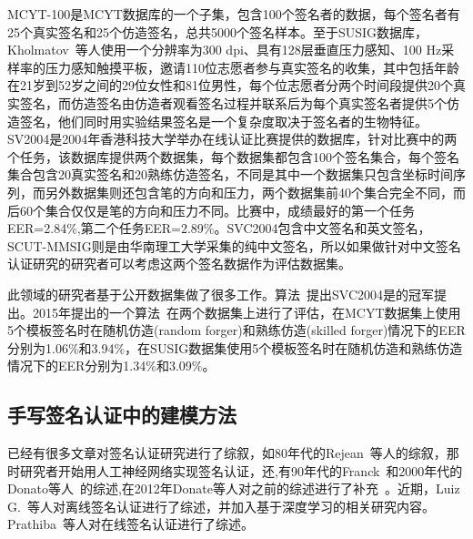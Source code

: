 MCYT-100是MCYT数据库的一个子集，包含100个签名者的数据，每个签名者有25个真实签名和25个仿造签名，总共5000个签名样本。至于SUSIG数据库，Kholmatov~\cite{kholmatov2006sigsa}等人使用一个分辨率为300 dpi、具有128层垂直压力感知、100 Hz采样率的压力感知触摸平板，邀请110位志愿者参与真实签名的收集，其中包括年龄在21岁到52岁之间的29位女性和81位男性，每个位志愿者分两个时间段提供20个真实签名，而仿造签名由仿造者观看签名过程并联系后为每个真实签名者提供5个仿造签名，他们同时用实验结果签名是一个复杂度取决于签名者的生物特征。SV2004是2004年香港科技大学举办在线认证比赛提供的数据库，针对比赛中的两个任务，该数据库提供两个数据集，每个数据集都包含100个签名集合，每个签名集合包含20真实签名和20熟练仿造签名，不同是其中一个数据集只包含坐标时间序列，而另外数据集则还包含笔的方向和压力，两个数据集前40个集合完全不同，而后60个集合仅仅是笔的方向和压力不同。比赛中，成绩最好的第一个任务EER=2.84\%,第二个任务EER=2.89\%。SVC2004包含中文签名和英文签名，SCUT-MMSIG则是由华南理工大学采集的纯中文签名，所以如果做针对中文签名认证研究的研究者可以考虑这两个签名数据作为评估数据集。

此领域的研究者基于公开数据集做了很多工作。算法~\cite{kholmatov2005identity}提出SVC2004是的冠军提出。2015年提出的一个算法~\cite{fischer2015robust}在两个数据集上进行了评估，在MCYT数据集上使用5个模板签名时在随机仿造(random forger)和熟练仿造(skilled forger)情况下的EER分别为1.06\%和3.94\%，在SUSIG数据集使用5个模板签名时在随机仿造和熟练仿造情况下的EER分别为1.34\%和3.09\%。

\subsection{手写签名认证中的建模方法}

已经有很多文章对签名认证研究进行了综叙，如80年代的Rejean~\cite{plamondon1989automatic}等人的综叙，那时研究者开始用人工神经网络实现签名认证，还,有90年代的Franck~\cite{leclerc1994automatic}和2000年代的Donato等人~\cite{impedovo2008automatic}的综述,在2012年Donate等人对之前的综述进行了补充~\cite{impedovo2012handwritten}。近期，Luiz G.~\cite{hafemann2017offline}等人对离线签名认证进行了综述，并加入基于深度学习的相关研究内容。Prathiba~\cite{prathiba2014online}等人对在线签名认证进行了综述。

